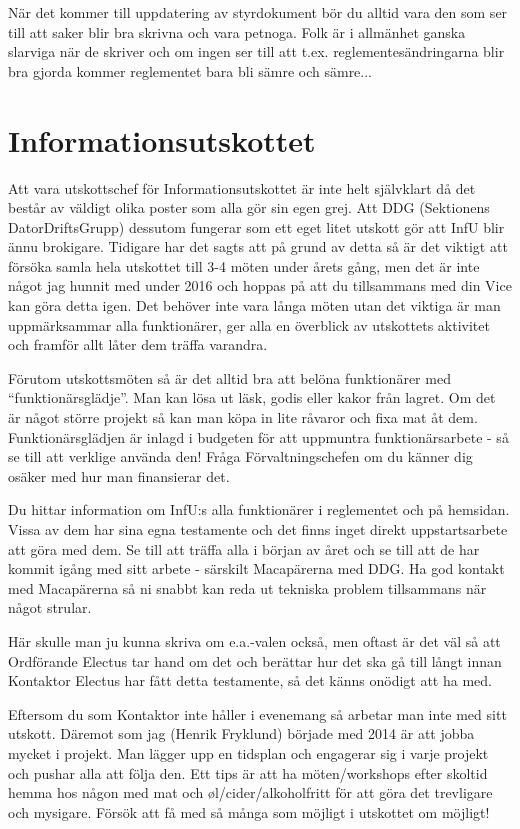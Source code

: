 \documentclass[10pt]{article}
\begin{document}
När det kommer till uppdatering av styrdokument bör du alltid vara den som ser till att saker blir bra skrivna och vara petnoga. Folk är i allmänhet ganska slarviga när de skriver och om ingen ser till att t.ex. reglementesändringarna blir bra gjorda kommer reglementet bara bli sämre och sämre...

\newpage
\section{Informationsutskottet}
Att vara utskottschef för Informationsutskottet är inte helt självklart då det består av väldigt olika poster som alla gör sin egen grej. Att DDG (Sektionens DatorDriftsGrupp) dessutom fungerar som ett eget litet utskott gör att InfU blir ännu brokigare. Tidigare har det sagts att på grund av detta så är det viktigt att försöka samla hela utskottet till 3-4 möten under årets gång, men det är inte något jag hunnit med under 2016 och hoppas på att du tillsammans med din Vice kan göra detta igen. Det behöver inte vara långa möten utan det viktiga är man uppmärksammar alla funktionärer, ger alla en överblick av utskottets aktivitet och framför allt låter dem träffa varandra.

Förutom utskottsmöten så är det alltid bra att belöna funktionärer med ``funktionärsglädje''. Man kan lösa ut läsk, godis eller kakor från lagret. Om det är något större projekt så kan man köpa in lite råvaror och fixa mat åt dem. Funktionärsglädjen är inlagd i budgeten för att uppmuntra funktionärsarbete - så se till att verklige använda den! Fråga Förvaltningschefen om du känner dig osäker med hur man finansierar det.

Du hittar information om InfU:s alla funktionärer i reglementet och på hemsidan. Vissa av dem har sina egna testamente och det finns inget direkt uppstartsarbete att göra med dem. Se till att träffa alla i början av året och se till att de har kommit igång med sitt arbete - särskilt Macapärerna med DDG. Ha god kontakt med Macapärerna så ni snabbt kan reda ut tekniska problem tillsammans när något strular.

Här skulle man ju kunna skriva om e.a.-valen också, men oftast är det väl så att Ordförande Electus tar hand om det och berättar hur det ska gå till långt innan Kontaktor Electus har fått detta testamente, så det känns onödigt att ha med.

Eftersom du som Kontaktor inte håller i evenemang så arbetar man inte med sitt utskott. Däremot som jag (Henrik Fryklund) började med 2014 är att jobba mycket i projekt. Man lägger upp en tidsplan och engagerar sig i varje projekt och pushar alla att följa den. Ett tips är att ha möten/workshops efter skoltid hemma hos någon med mat och \o l/cider/alkoholfritt för att göra det trevligare och mysigare. Försök att få med så många som möjligt i utskottet om möjligt!
\end{document}
